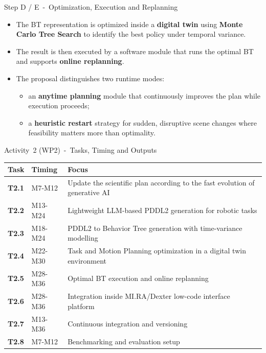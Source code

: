 \documentclass[aspectratio=169,10pt]{beamer}
\begin{document}
\begin{frame}{Step D / E~-~Optimization, Execution and Replanning}

\small
\begin{itemize}
  \item The BT representation is optimized inside a \textbf{digital twin} using \textbf{Monte Carlo Tree Search} to identify the best policy under temporal variance.
  \item The result is then executed by a software module that runs the optimal BT and supports \textbf{online replanning}.
  \item The proposal distinguishes two runtime modes:
  \begin{itemize}
    \item an \textbf{anytime planning} module that continuously improves the plan while execution proceeds;
    \item a \textbf{heuristic restart} strategy for sudden, disruptive scene changes where feasibility matters more than optimality.
  \end{itemize}
\end{itemize}

\end{frame}


\begin{frame}{Activity~2 (WP2)~-~Tasks, Timing and Outputs}

\small
\begin{tabularx}{\textwidth}{>{\bfseries}p{} p{} X}
\toprule
Task & Timing & Focus \\
\midrule
T2.1 & M7-M12 & Update the scientific plan according to the fast evolution of generative AI \\
T2.2 & M13-M24 & Lightweight LLM-based PDDL2 generation for robotic tasks \\
T2.3 & M18-M24 & PDDL2 to Behavior Tree generation with time-variance modelling \\
T2.4 & M22-M30 & Task and Motion Planning optimization in a digital twin environment \\
T2.5 & M28-M36 & Optimal BT execution and online replanning \\
T2.6 & M28-M36 & Integration inside MI.RA/Dexter low-code interface platform \\
T2.7 & M13-M36 & Continuous integration and versioning \\
T2.8 & M7-M12 & Benchmarking and evaluation setup \\
\bottomrule
\end{tabularx}

\end{frame}
\end{document}

